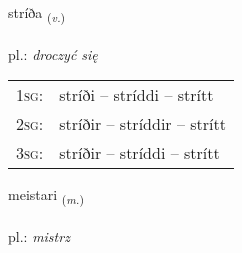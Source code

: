 \documentclass[frontgrid, backgrid]{flacards}\usepackage[]{graphicx}\usepackage[]{xcolor}
\begin{document}
\renewcommand{\flhead}{\vskip5pt \fboxsep=0pt {\small\bfseries\footnotesize Sagnorð | czasownik}}
\renewcommand{\fcfoot}{\vskip5pt \fboxsep=0pt \hspace{2pt}{\small\bfseries\footnotesize 3K}}

\renewcommand{\blhead}{\vskip5pt {\small\bfseries\footnotesize Sagnorð | czasownik }}
\renewcommand{\bcfoot}{\vskip5pt \hspace{2pt}{\small\bfseries\footnotesize 3K}}


{stríða \small{\textsubscript{(\textit{v.})}} \\[1ex] %
\textphonetic{[striːða]} \\
pl.: \emph{droczyć się} \\  [2ex]
\renewcommand*{\arraystretch}{0.8}
\begin{tabular}{p{1cm}l}
\textsc{1sg}: & stríði -- stríddi -- strítt \\ 
\textsc{2sg}: & stríðir -- stríddir -- strítt \\ 
\textsc{3sg}: & stríðir -- stríddi -- strítt \\ 
\end{tabular}
}

\renewcommand{\flhead}{\vskip5pt \fboxsep=0pt {\small\bfseries\footnotesize Nafnorð | rzeczownik}}
\renewcommand{\fcfoot}{\vskip5pt \fboxsep=0pt \hspace{2pt}{\small\bfseries\footnotesize 3K}}

\renewcommand{\blhead}{\vskip5pt {\small\bfseries\footnotesize Nafnorð | rzeczownik }}
\renewcommand{\bcfoot}{\vskip5pt \hspace{2pt}{\small\bfseries\footnotesize 3K}}


{meistari \small{\textsubscript{(\textit{m.})}} \\[1ex] %
\textphonetic{[meistarɪ]} \\
pl.: \emph{mistrz} \\  [2ex]
\renewcommand*{\arraystretch}{0.8}
}
\end{document}
